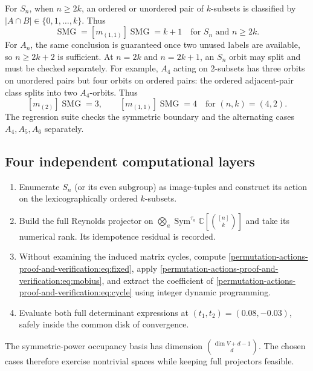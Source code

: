 \documentclass[10pt]{article}
\newcommand{\Sym}{\operatorname{Sym}}
\newcommand{\SMG}{\operatorname{SMG}}
\newcommand{\MGF}{\SMG}
\begin{document}
For $S_n$, when $n\geq2k$, an ordered or unordered pair of $k$-subsets is
classified by $|A\cap B|\in\{0,1,\ldots,k\}$.  Thus
\begin{equation}
 [m_{(2)}]\MGF=[m_{(1,1)}]\MGF=k+1
 \quad\text{for $S_n$ and $n\geq2k$.}
 \label{permutation-actions-proof-and-verification:eq:quadratic}
\end{equation}
For $A_n$, the same conclusion is guaranteed once two unused labels are
available, so $n\geq2k+2$ is sufficient.  At $n=2k$ and $n=2k+1$, an $S_n$
orbit may split and must be checked separately.  For example, $A_4$ acting on
2-subsets has three orbits on unordered pairs but four orbits on ordered
pairs: the ordered adjacent-pair class splits into two $A_4$-orbits.  Thus
\[
 [m_{(2)}]\MGF=3,\qquad [m_{(1,1)}]\MGF=4
 \quad\text{for $(n,k)=(4,2)$.}
\]
The regression suite checks the symmetric boundary and the alternating cases
$A_4,A_5,A_6$ separately.

\subsection{Four independent computational layers}
\begin{enumerate}
\item Enumerate $S_n$ (or its even subgroup) as image-tuples and construct its
      action on the lexicographically ordered $k$-subsets.
\item Build the full Reynolds projector on
      $\bigotimes_a\Sym^{\tau_a}\mathbb C[\binom{[n]}k]$ and take its numerical
      rank.  Its idempotence residual is recorded.
\item Without examining the induced matrix cycles, compute
      \eqref{permutation-actions-proof-and-verification:eq:fixed}, apply \eqref{permutation-actions-proof-and-verification:eq:mobius}, and extract the coefficient of
      \eqref{permutation-actions-proof-and-verification:eq:cycle} using integer dynamic programming.
\item Evaluate both full determinant expressions at
      $(t_1,t_2)=(0.08,-0.03)$, safely inside the common disk of convergence.
\end{enumerate}
The symmetric-power occupancy basis has dimension
$\binom{\dim V+d-1}{d}$.  The chosen cases therefore exercise nontrivial
spaces while keeping full projectors feasible.
\end{document}
